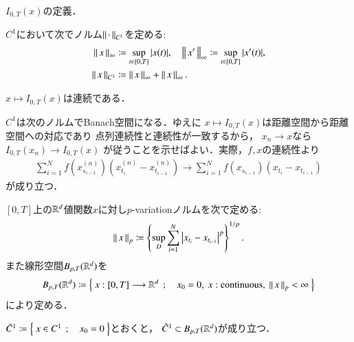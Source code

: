 \begin{screen}
	\begin{dfn}
		$I_{0,T}(x)$の定義．
	\end{dfn}
\end{screen}

$C^1$において次でノルム$\left\|\, \cdot\, \right\|_{C^1}$を定める:
\begin{align}
	\left\|\, x\, \right\|_{\infty} &\coloneqq \operatorname*{sup}_{t \in [0,T]} |x(t)|,
	\quad \left\|\, x'\, \right\|_{\infty} \coloneqq \operatorname*{sup}_{t \in [0,T]} |x'(t)|, \\
	\left\|\, x\, \right\|_{C^1} &\coloneqq
	\left\|\, x\, \right\|_{\infty} + \left\|\, x\, \right\|_{\infty}.
\end{align}

\begin{screen}
	\begin{thm}
		$x \longmapsto I_{0,T}(x)$は連続である．
	\end{thm}
\end{screen}

\begin{prf}
	$C^1$は次のノルムでBanach空間になる．ゆえに
	$x \longmapsto I_{0,T}(x)$は距離空間から距離空間への対応であり
	点列連続性と連続性が一致するから，
	$x_n \longrightarrow x$なら$I_{0,T}(x_n) \longrightarrow I_{0,T}(x)$
	が従うことを示せばよい．実際，$f,x$の連続性より
	\begin{align}
		\sum_{i=1}^{N} f(x^{(n)}_{s_{i-1}})(x^{(n)}_{t_i} - x^{(n)}_{t_{i-1}})
		\longrightarrow \sum_{i=1}^{N} f(x_{s_{i-1}})(x_{t_i} - x_{t_{i-1}})
	\end{align}
	が成り立つ．
\end{prf}

\begin{screen}
	\begin{dfn}[$p$-variation]
		$[0,T]$上の$\mathbb{R}^d$値関数$x$に対し$p$-variationノルムを次で定める:
		\begin{align}
			\left\|\, x\, \right\|_{p}
			\coloneqq \left\{ \operatorname*{sup}_{D} \sum_{i=1}^{N} 
				\left| x_{t_i} - x_{t_{i-1}} \right|^p \right\}^{1/p}.
		\end{align}
		また線形空間$B_{p,T}(\mathbb{R}^d)$を
		\begin{align}
			B_{p,T}(\R^d)
			\coloneqq \Set{x:[0,T] \longrightarrow \R^d}{x_0=0,\ x:\mbox{continuous},\ \Norm{x}{p} < \infty}
		\end{align}
		により定める．
	\end{dfn}
\end{screen}

\begin{screen}
	\begin{thm}
		$\tilde{C}^1 \coloneqq \left\{\ x \in C^1\ \, ; \quad x_0 = 0\ \right\}$とおくと，
		$\tilde{C}^1 \subset B_{p,T}(\mathbb{R}^d)$が成り立つ．
	\end{thm}
\end{screen}

